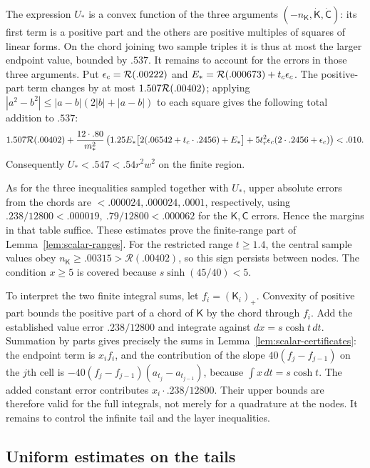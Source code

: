 The expression \(U_*\) is a convex function of the three arguments
\((-n_{\mathsf K},\dot{\mathsf K},\dot{\mathsf C})\): its first term
is a positive part and the others are positive multiples of squares
of linear forms. On the chord joining two sample triples it is thus
at most the larger endpoint value, bounded by \(.537\).
It remains to account for the errors in those three arguments.
Put \(\epsilon_c={\cal R}(.00222)\) and
\(E_*={\cal R}(.000673)+t_c\epsilon_c\).
The positive-part term changes by at most
\(1.507{\cal R}(.00402)\); applying
\(|a^2-b^2|\le|a-b|(2|b|+|a-b|)\) to each square gives the
following total addition to \(.537\):
\[
 1.507{\cal R}(.00402)+\frac{12\cdot .80}{m_*^2}
 \left(1.25 E_*\big[2(.06542+t_c\cdot.2456)+E_*\big]
             +5t_r^2\epsilon_c(2\cdot .2456+\epsilon_c)\right)<.010 .
\]
Consequently \(U_*<.547<.54r^2w^2\) on the finite region.

As for the three inequalities sampled together with \(U_*\), upper absolute errors from the chords are \(<.000024,.000024,.0001\), respectively, using \(.238/12800<.000019,\ .79/12800<.000062\) for the \(\mathsf K,\mathsf C\) errors. Hence the margins in that table suffice. These estimates prove the finite-range part of Lemma~\ref{lem:scalar-ranges}.
For the restricted range \(t\ge1.4\), the central sample values obey
\(n_{\mathsf K}\ge.00315>\mathcal R(.00402)\), so this sign persists
between nodes. The condition \(x\ge5\) is covered because
\(s\sinh(45/40)<5\).

To interpret the two finite integral sums, let \(f_i=(\mathsf K_i)_+\).
Convexity of positive part bounds the positive part of a chord of
\(\mathsf K\) by the chord through \(f_i\). Add the established
value error \(.238/12800\) and integrate against \(dx=s\cosh t\,dt\).
Summation by parts gives precisely the sums in
Lemma~\ref{lem:scalar-certificates}: the endpoint term is \(x_if_i\),
and the contribution of the slope \(40(f_j-f_{j-1})\) on the
\(j\)th cell is
\(-40(f_j-f_{j-1})(a_{t_j}-a_{t_{j-1}})\), because
\(\int x\,dt=s\cosh t\). The added constant error contributes
\(x_i\cdot.238/12800\). Their upper bounds are therefore
valid for the full integrals, not merely for a quadrature at the nodes.
It remains to control the infinite tail and the layer inequalities.

\subsection{Uniform estimates on the tails}

